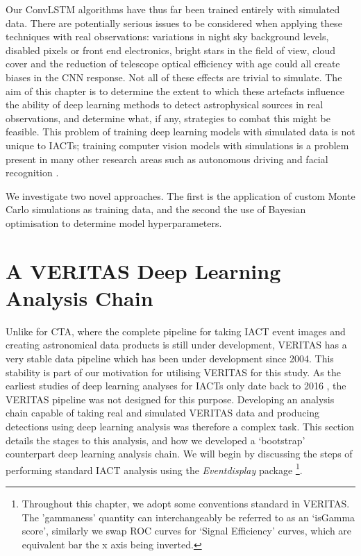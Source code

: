 Our ConvLSTM algorithms have thus far been trained entirely with simulated data. There are potentially serious issues to be considered when applying these techniques with real observations: variations in night sky background levels, disabled pixels or front end electronics, bright stars in the field of view, cloud cover and the reduction of telescope optical efficiency with age could all create biases in the CNN response. Not all of these effects are trivial to simulate. The aim of this chapter is to determine the extent to which these artefacts influence the ability of deep learning methods to detect astrophysical sources in real observations, and determine what, if any, strategies to combat this might be feasible. This problem of training deep learning models with simulated data is not unique to IACTs; training computer vision models with simulations is a problem present in many other research areas such as autonomous driving \cite{gtav} and facial recognition \cite{simgan}.

We investigate two novel approaches. The first is the application of custom Monte Carlo simulations as training data, and the second the use of Bayesian optimisation to determine model hyperparameters.

\section{A VERITAS Deep Learning Analysis Chain}
Unlike for CTA, where the complete pipeline for taking IACT event images and creating astronomical data products is still under development, VERITAS has a very stable data pipeline which has been under development since 2004. This stability is part of our motivation for utilising VERITAS for this study. As the earliest studies of deep learning analyses for IACTs only date back to 2016 \cite{feng2016}, the VERITAS pipeline was not designed for this purpose. Developing an analysis chain capable of taking real and simulated VERITAS data and producing detections using deep learning analysis was therefore a complex task. This section details the stages to this analysis, and how we developed a `bootstrap' counterpart deep learning analysis chain. We will begin by discussing the steps of performing standard IACT analysis using the \textit{Eventdisplay} package \footnote{Throughout this chapter, we adopt some conventions standard in VERITAS. The 'gammaness' quantity can interchangeably be referred to as an `isGamma score', similarly we swap ROC curves for `Signal Efficiency' curves, which are equivalent bar the x axis being inverted.}.

